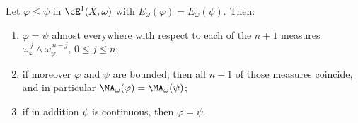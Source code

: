\begin{proposition}
\label{prop:ch26-strict-monotone}
Let \(\varphi\leq\psi\) in \(\cE^1(X,\omega)\) with
\(E_\omega(\varphi)=E_\omega(\psi)\).  Then:
\begin{enumerate}
\item\label{itm:ch26-strict:ae}
 \(\varphi=\psi\) almost everywhere with respect to each of the \(n+1\)
 measures \(\omega_\varphi^{\,j}\wedge\omega_\psi^{\,n-j}\),
 \(0\leq j\leq n\);
\item\label{itm:ch26-strict:bounded}
 if moreover \(\varphi\) and \(\psi\) are bounded, then all \(n+1\) of those
 measures coincide, and in particular
 \(\MA_\omega(\varphi)=\MA_\omega(\psi)\);
\item\label{itm:ch26-strict:cont}
 if in addition \(\psi\) is continuous, then \(\varphi=\psi\).
\end{enumerate}
\end{proposition}

